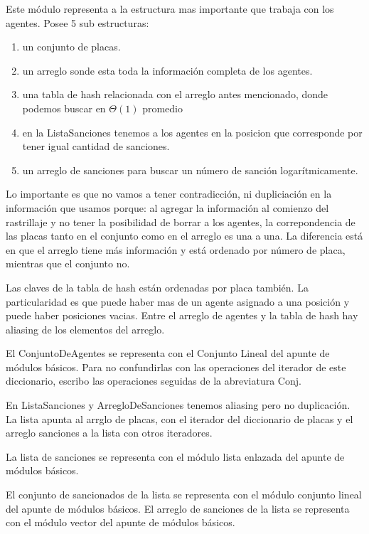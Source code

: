 \begin{Representacion}


Este m\'odulo representa a la estructura mas importante que trabaja con los agentes. Posee 5 sub estructuras: 
\begin{enumerate}
\item un conjunto de placas.
\item un arreglo sonde esta toda la información completa de los agentes.
\item una tabla de hash relacionada con el arreglo antes mencionado, donde podemos buscar en $\Theta(1)$ promedio 
\item en la ListaSanciones tenemos a los agentes en la posicion que corresponde por tener igual cantidad de sanciones.
\item  un arreglo de sanciones para buscar un número de sanción logarítmicamente.
\end{enumerate}\par
Lo importante es que no vamos a tener contradicci\'on, ni dupliciaci\'on en la informaci\'on que usamos porque: al agregar la informaci\'on al comienzo del rastrillaje y no tener la posibilidad de borrar a los agentes, la correpondencia de las placas tanto en el conjunto como en el arreglo es una a una. La diferencia está en que el arreglo tiene más informaci\'on y está ordenado por número de placa, mientras que el conjunto no. 
\par Las claves de la tabla de hash est\'an ordenadas por placa tambi\'en. La particularidad es que puede haber mas de un agente asignado a una posici\'on y puede haber posiciones vacias. Entre el arreglo de agentes y la tabla de hash hay aliasing de los elementos del arreglo.\par
El ConjuntoDeAgentes se representa con el Conjunto Lineal del apunte de m\'odulos b\'asicos. Para no confundirlas con las operaciones del iterador de este diccionario, escribo las operaciones seguidas de la abreviatura Conj.\par
En ListaSanciones y ArregloDeSanciones tenemos aliasing pero no duplicaci\'on. La lista apunta al arrglo de placas, con el iterador del diccionario de placas y el arreglo sanciones a la lista con otros iteradores.\par
La lista de sanciones se representa con el m\'odulo lista enlazada del apunte de m\'odulos b\'asicos.\par
El conjunto de sancionados de la lista se representa con el m\'odulo conjunto lineal del apunte de m\'odulos b\'asicos.
El arreglo de sanciones de la lista se representa con el m\'odulo vector del apunte de m\'odulos b\'asicos.\par


\end{Representacion}
